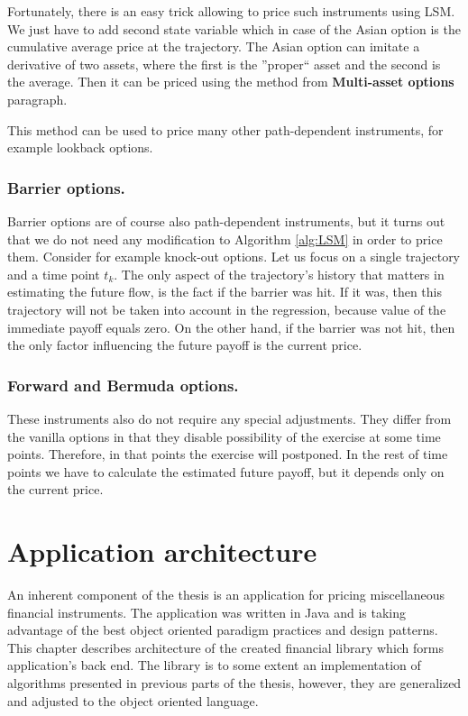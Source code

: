 \documentclass[a4paper,11pt, twoside]{book}
\theoremstyle{definition}
\theoremstyle{remark}
\newcounter{example}[chapter]
\begin{document}
Fortunately, there is an easy trick allowing to price such instruments using LSM. We just have to add second state variable which in case of the Asian option is the cumulative average price at the trajectory. The Asian option can imitate a derivative of two assets, where the first is the ''proper`` asset and the second is the average. Then it can be priced using the method from \textbf{Multi-asset options} paragraph.

This method can be used to price many other path-dependent instruments, for example lookback options.

\subsection{Barrier options.}
Barrier options are of course also path-dependent instruments, but it turns out that we do not need any modification to Algorithm \ref{alg:LSM} in order to price them. Consider for example knock-out options. Let us focus on a single trajectory and a time point $t_k$. The only aspect of the trajectory's history that matters in estimating the future flow, is the fact if the barrier was hit. If it was, then this trajectory will not be taken into account in the regression, because value of the immediate payoff equals zero. On the other hand, if the barrier was not hit, then the only factor influencing the future payoff is the current price.

\subsection{Forward and Bermuda options.}
These instruments also do not require any special adjustments. They differ from the vanilla options in that they disable possibility of the exercise at some time points. Therefore, in that points the exercise will postponed. In the rest of time points we have to calculate the estimated future payoff, but it depends only on the current price.



\chapter{Application architecture}
An inherent component of the thesis is an application for pricing miscellaneous financial instruments. The application was written in Java and is taking advantage of the best object oriented paradigm practices and design patterns. This chapter describes architecture of the created financial library which forms application's back end. The library is to some extent an implementation of algorithms presented in previous parts of the thesis, however, they are generalized and adjusted to the object oriented language.
\end{document}
